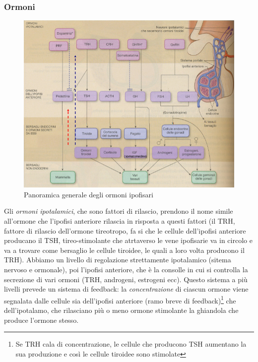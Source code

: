 \documentclass[a4paper,12pt]{article}
\begin{document}
\subsubsection{Ormoni}
\begin{figure}[H]
\centering
\includegraphics[scale=0.4]{immagine/ipofisari.jpg}
\caption{Panoramica generale degli ormoni ipofisari}
\end{figure}
Gli \emph{ormoni ipotalamici}, che sono fattori di rilascio, prendono il nome simile all'ormone che l'ipofisi anteriore rilascia in risposta a questi fattori (il TRH, fattore di rilascio dell'ormone tireotropo, fa si che le cellule dell'ipofisi anteriore producano il TSH, tireo-stimolante che atrtaverso le vene ipofisarie va in circolo e va a trovare come bersaglio le cellule tiroidee, le quali a loro volta producono il TRH). Abbiamo un livello di regolazione strettamente ipotalamico (sitema nervoso e ormonale), poi l'ipofisi anteriore, che è la consolle in cui si controlla la secrezione di vari ormoni (TRH, androgeni, estrogeni ecc). Questo sistema a più livelli prevede un sistema di feedback: la \emph{concentrazione} di ciascun ormone viene segnalata dalle cellule sia dell'ipofisi anteriore (ramo breve di feedback)\footnote{Se TRH cala di concentrazione, le cellule che producono TSH aumentano la sua produzione e così le cellule tiroidee sono stimolate} che dell'ipotalamo, che rilasciano più o meno ormone stimolante la ghiandola che produce l'ormone stesso.
\end{document}
